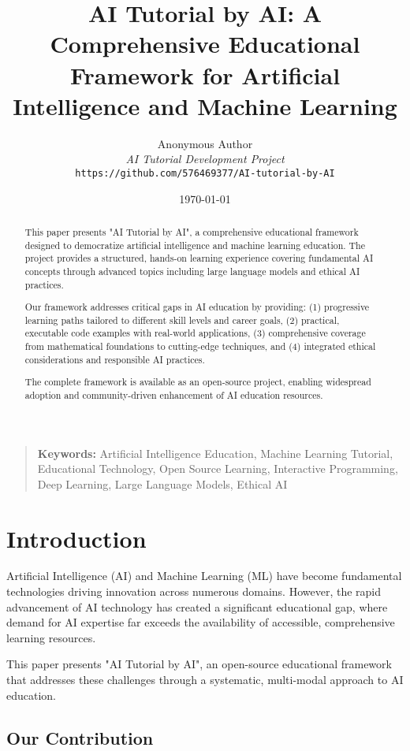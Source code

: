\documentclass[11pt,twocolumn]{article}
\title{AI Tutorial by AI: A Comprehensive Educational Framework for Artificial Intelligence and Machine Learning}
\author{
    Anonymous Author\\
    \textit{AI Tutorial Development Project}\\
    \texttt{https://github.com/576469377/AI-tutorial-by-AI}
}
\date{\today}
\begin{document}
\maketitle

\begin{abstract}
This paper presents "AI Tutorial by AI", a comprehensive educational framework designed to democratize artificial intelligence and machine learning education. The project provides a structured, hands-on learning experience covering fundamental AI concepts through advanced topics including large language models and ethical AI practices. 

Our framework addresses critical gaps in AI education by providing: (1) progressive learning paths tailored to different skill levels and career goals, (2) practical, executable code examples with real-world applications, (3) comprehensive coverage from mathematical foundations to cutting-edge techniques, and (4) integrated ethical considerations and responsible AI practices.

The complete framework is available as an open-source project, enabling widespread adoption and community-driven enhancement of AI education resources.
\end{abstract}

\begin{quote}
\textbf{Keywords:} Artificial Intelligence Education, Machine Learning Tutorial, Educational Technology, Open Source Learning, Interactive Programming, Deep Learning, Large Language Models, Ethical AI
\end{quote}

\section{Introduction}

Artificial Intelligence (AI) and Machine Learning (ML) have become fundamental technologies driving innovation across numerous domains. However, the rapid advancement of AI technology has created a significant educational gap, where demand for AI expertise far exceeds the availability of accessible, comprehensive learning resources.

This paper presents "AI Tutorial by AI", an open-source educational framework that addresses these challenges through a systematic, multi-modal approach to AI education.

\subsection{Our Contribution}
\end{document}
